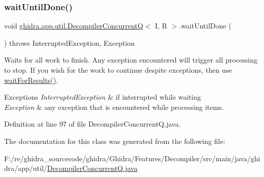 \subsubsection{\texorpdfstring{waitUntilDone()}{waitUntilDone()}}
{\footnotesize\ttfamily void \mbox{\hyperlink{classghidra_1_1app_1_1util_1_1_decompiler_concurrent_q}{ghidra.\+app.\+util.\+Decompiler\+ConcurrentQ}}$<$ I, R $>$.wait\+Until\+Done (\begin{DoxyParamCaption}{ }\end{DoxyParamCaption}) throws Interrupted\+Exception, Exception\hspace{0.3cm}{\ttfamily [inline]}}

Waits for all work to finish. Any exception encountered will trigger all processing to stop. If you wish for the work to continue despite exceptions, then use \mbox{\hyperlink{classghidra_1_1app_1_1util_1_1_decompiler_concurrent_q_acf02756d2c1b9ab17c3871870601f76e}{wait\+For\+Results()}}.


\begin{DoxyExceptions}{Exceptions}
{\em Interrupted\+Exception} & if interrupted while waiting \\
\hline
{\em Exception} & any exception that is encountered while processing items. \\
\hline
\end{DoxyExceptions}


Definition at line 97 of file Decompiler\+Concurrent\+Q.\+java.



The documentation for this class was generated from the following file\+:\begin{DoxyCompactItemize}
\item 
F\+:/re/ghidra\+\_\+sourcecode/ghidra/\+Ghidra/\+Features/\+Decompiler/src/main/java/ghidra/app/util/\mbox{\hyperlink{_decompiler_concurrent_q_8java}{Decompiler\+Concurrent\+Q.\+java}}\end{DoxyCompactItemize}
